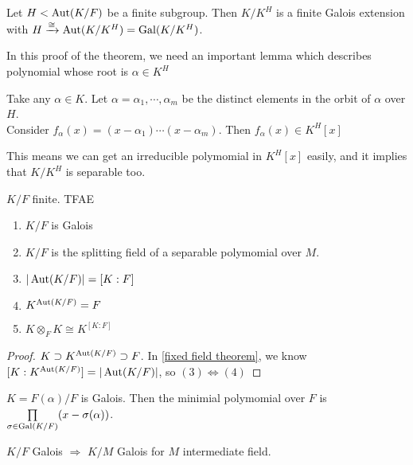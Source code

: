 \begin{theorem}\label{fixed field theorem}
    Let  $ H<\operatorname{Aut}(K/F) $ be a finite subgroup. Then  $ K/K^H $ is a finite Galois extension with  $ H\xrightarrow{\cong}\operatorname{Aut}(K/K^H)=\operatorname{Gal}(K/K^H) $.  
\end{theorem}
In this proof of the theorem, we need an important lemma which describes polynomial whose root is  $ \alpha\in K^H $ 
\begin{lemma}
    Take any  $ \alpha\in K $. Let  $ \alpha=\alpha_1,\cdots,\alpha_m $ be the distinct elements in the orbit of  $ \alpha $ over  $ H $.\\
    Consider  $ f_\alpha(x)=(x-\alpha_1)\cdots(x-\alpha_m) $. Then  $ f_\alpha(x)\in K^H[x] $     
\end{lemma}
This means we can get an irreducible polymomial in  $ K^H[x] $ easily, and it implies that  $ K/K^H  $ is separable too. 
\begin{theorem}
     $ K/F  $ finite. TFAE
     \begin{enumerate}[(1)]
        \item  $ K/F  $ is Galois
        \item  $ K/F  $ is the splitting field of a separable polymomial over  $ M  $.
        \item  $ |\operatorname{Aut}(K/F)|=[K:F] $
        \item  $K^{\operatorname{Aut}(K/F)}=F $ 
        \item   $ K\otimes_F K\cong K^{[K:F]} $ 
     \end{enumerate}
\end{theorem}
\begin{proof}
     $ K\supset K^{\operatorname{Aut}(K/F)}\supset F $. In \cref{fixed field theorem}, we know  $ [K:K^{\operatorname{Aut}(K/F)}]=|\operatorname{Aut}(K/F)| $, so  $ (3)\Leftrightarrow (4) $  
\end{proof}
\begin{corollary}
     $ K=F(\alpha)/F $  is Galois. Then the minimial polymomial over  $ F  $ is  $ \prod\limits_{\sigma\in \operatorname{Gal}(K/F)}(x-\sigma(\alpha))  $. 
\end{corollary}
\begin{corollary}
     $ K/F  $ Galois  $ \Rightarrow  $  $ K/M  $ Galois for  $ M  $ intermediate field.
\end{corollary}
